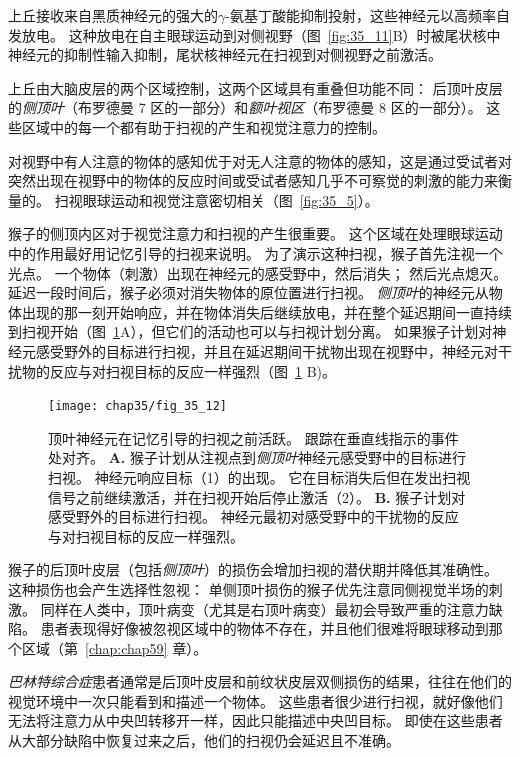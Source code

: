 上丘接收来自黑质神经元的强大的$\gamma$-氨基丁酸能抑制投射，这些神经元以高频率自发放电。
这种放电在自主眼球运动到对侧视野（图~\ref{fig:35_11}B）时被尾状核中神经元的抑制性输入抑制，尾状核神经元在扫视到对侧视野之前激活。


上丘由大脑皮层的两个区域控制，这两个区域具有重叠但功能不同：
后顶叶皮层的\textit{侧顶叶}（布罗德曼 7 区的一部分）和\textit{额叶视区}（布罗德曼 8 区的一部分）。 
这些区域中的每一个都有助于扫视的产生和视觉注意力的控制。


对视野中有人注意的物体的感知优于对无人注意的物体的感知，这是通过受试者对突然出现在视野中的物体的反应时间或受试者感知几乎不可察觉的刺激的能力来衡量的。
扫视眼球运动和视觉注意密切相关（图~\ref{fig:35_5}）。


猴子的侧顶内区对于视觉注意力和扫视的产生很重要。
这个区域在处理眼球运动中的作用最好用记忆引导的扫视来说明。
为了演示这种扫视，猴子首先注视一个光点。
一个物体（刺激）出现在神经元的感受野中，然后消失；
然后光点熄灭。
延迟一段时间后，猴子必须对消失物体的原位置进行扫视。
\textit{侧顶叶}的神经元从物体出现的那一刻开始响应，并在物体消失后继续放电，并在整个延迟期间一直持续到扫视开始（图~\ref{fig:35_12}A），但它们的活动也可以与扫视计划分离。
如果猴子计划对神经元感受野外的目标进行扫视，并且在延迟期间干扰物出现在视野中，神经元对干扰物的反应与对扫视目标的反应一样强烈（图~\ref{fig:35_12} B)。


\begin{figure}[htbp]
	\centering
	\texttt{[image: chap35/fig\_35\_12]}
	\caption{顶叶神经元在记忆引导的扫视之前活跃。
		跟踪在垂直线指示的事件处对齐\cite{powell2000response}。
		\textbf{A.} 猴子计划从注视点到\textit{侧顶叶}神经元感受野中的目标进行扫视。
		神经元响应目标（1）的出现。
		它在目标消失后但在发出扫视信号之前继续激活，并在扫视开始后停止激活（2）。
		\textbf{B.} 猴子计划对感受野外的目标进行扫视。
		神经元最初对感受野中的干扰物的反应与对扫视目标的反应一样强烈。}
	\label{fig:35_12}
\end{figure}



猴子的后顶叶皮层（包括\textit{侧顶叶}）的损伤会增加扫视的潜伏期并降低其准确性。
这种损伤也会产生选择性忽视：
单侧顶叶损伤的猴子优先注意同侧视觉半场的刺激。
同样在人类中，顶叶病变（尤其是右顶叶病变）最初会导致严重的注意力缺陷。
患者表现得好像被忽视区域中的物体不存在，并且他们很难将眼球移动到那个区域（第~\ref{chap:chap59} 章）。


\textit{巴林特综合症}患者通常是后顶叶皮层和前纹状皮层双侧损伤的结果，往往在他们的视觉环境中一次只能看到和描述一个物体。
这些患者很少进行扫视，就好像他们无法将注意力从中央凹转移开一样，因此只能描述中央凹目标。
即使在这些患者从大部分缺陷中恢复过来之后，他们的扫视仍会延迟且不准确。


